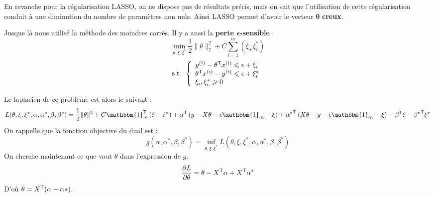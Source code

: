 En revanche pour la régularisation LASSO, on ne dispose pas de résultats précis, mais on sait que l'utilisation de cette régularisation conduit à une diminution du nombre de paramètres non nuls. Ainsi LASSO permet d'avoir le vecteur $\bm{\theta}$ \textbf{creux}.


Jusque là nous utilisé la méthode des moindres carrés. Il y a aussi la \textbf{perte $\bm{\epsilon}$-sensible} :
$$ \min_{\theta, \xi, \xi^*} \frac{1}{2} \| \theta \|_2^2 + C \sum_{i = 1}^m \left( \xi_ + \xi_i^* \right) $$
\vspace{-3mm}
$$ \text{s.t. } \left\{ \begin{array}{l}
	y^{(i)} - \theta^{\mathsf{T}} x^{(i)} \leqslant \epsilon + \xi_i \\
	\theta^{\mathsf{T}} x^{(i)} - y^{(i)} \leqslant \epsilon + \xi_i^* \\
	\xi_i, \xi_i^* \geqslant 0
\end{array} \right. $$

Le laplacien de ce problème est alors le suivant :
$$ L(\theta, \xi, \xi^*, \alpha, \alpha^*, \beta, \beta^*) = \dfrac{1}{2} \| \theta \|^2 + C \mathbbm{1}_m^\trans \left( \xi + \xi^* \right) + \alpha^\trans \left( y - X \theta - \epsilon \mathbbm{1}_m - \xi \right) + {\alpha^*}^\trans \left( X \theta - y - \epsilon \mathbbm{1}_m - \xi \right) - \beta^\trans \xi - {\beta^*}^\trans \xi^*$$
On rappelle que la fonction objective du dual est :
$$ g(\alpha, \alpha^*, \beta, \beta^*) = \inf_{\theta, \xi, \xi^*} L(\theta, \xi, \xi^*, \alpha, \alpha^*, \beta, \beta^*) $$
On cherche maintenant ce que vaut $\theta$ dans l'expression de $g$.
$$ \dfrac{\partial L}{\partial \theta} = \theta - X^{\mathsf{T}} \alpha + X^{\mathsf{T}} \alpha^* $$
D'où $\theta = X^{\mathsf{T}} (\alpha - \alpha*)$.

